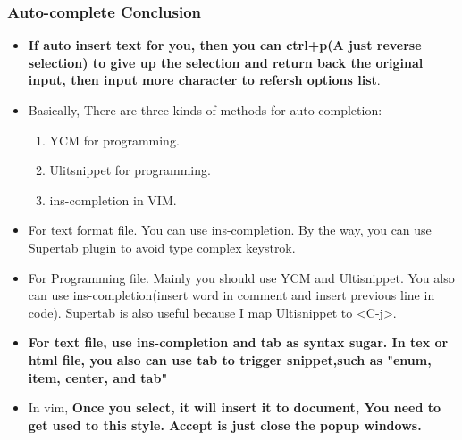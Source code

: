\documentclass[paper=8.5in:11in, twoside, 12pt, pagesize=pdftex]{book}
\begin{document}
									\subsubsection{Auto-complete Conclusion}
									
									\begin{itemize}
										\item \textbf{If auto insert text for you, then you can ctrl+p(A just reverse selection) to give up the selection and return back the original input, then input more character to refersh options list}.
										
										\item Basically, There are three kinds of methods for auto-completion:  
										\begin{enumerate}
											\item YCM for programming.
											\item Ulitsnippet for programming.
											\item ins-completion in VIM.
										\end{enumerate}
										\item For text format file. You can use ins-completion. By the way, you can use Supertab plugin to avoid type complex keystrok. 
										
										\item For Programming file. Mainly you should use YCM and Ultisnippet. You also can use ins-completion(insert word in comment and insert previous line in code). Supertab is also useful because I map Ultisnippet to <C-j>.
										
										\item \textbf{For text file, use ins-completion and tab as syntax sugar. In tex or html file, you also can use tab to trigger snippet,such as "enum, item, center, and tab"}
										
										\item In vim, \textbf{Once you select, it will insert it to document, You need to get used to this style. Accept is just close the popup windows.}
										

\end{itemize}
\end{document}
